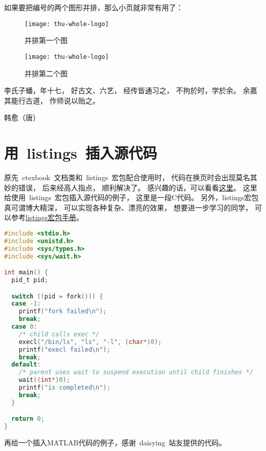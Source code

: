 如果要把编号的两个图形并排，那么小页就非常有用了：
\begin{figure}
\begin{minipage}{0.48\textwidth}
  \centering
  \texttt{[image: thu-whole-logo]}
  \caption{并排第一个图}
  \label{fig:parallel1}
\end{minipage}\hfill
\begin{minipage}{0.48\textwidth}
  \centering
  \texttt{[image: thu-whole-logo]}
  \caption{并排第二个图}
  \label{fig:parallel2}
\end{minipage}
\end{figure}

李氏子蟠，年十七，
好古文、六艺，
经传皆通习之，
不拘於时，学於余。
余嘉其能行古道，
作师说以贻之。

\hfill \pozhehao 韩愈（唐）


\section{用~listings~插入源代码}

原先~ctexbook~文档类和~listings~宏包配合使用时，
代码在换页时会出现莫名其妙的错误，
后来经高人指点，
顺利解决了。
感兴趣的话，可以看看\href{http://bbs.ctex.org/viewthread.php?tid=53451}{这里}。
这里给使用~listings~宏包插入源代码的例子，
这里是一段C代码。
另外，listings宏包真可谓博大精深，
可以实现各种复杂、漂亮的效果，
想要进一步学习的同学，
可以参考\href{http://mirror.ctan.org/macros/latex/contrib/listings/listings.pdf}{listings宏包手册}。

\begin{lstlisting}[language={C}, caption={一段C源代码}]
#include <stdio.h>
#include <unistd.h>
#include <sys/types.h>
#include <sys/wait.h>

int main() {
  pid_t pid;

  switch ((pid = fork())) {
  case -1:
    printf("fork failed\n");
    break;
  case 0:
    /* child calls exec */
    execl("/bin/ls", "ls", "-l", (char*)0);
    printf("execl failed\n");
    break;
  default:
    /* parent uses wait to suspend execution until child finishes */
    wait((int*)0);
    printf("is completed\n");
    break;
  }

  return 0;
}
\end{lstlisting}

再给一个插入MATLAB代码的例子，感谢~daisying~站友提供的代码。

